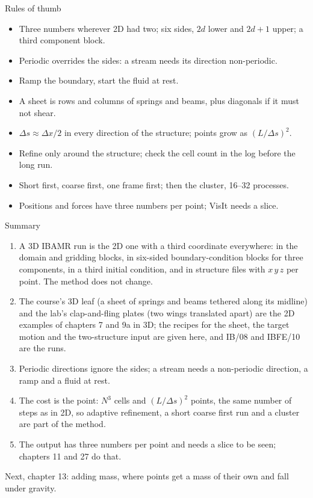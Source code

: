 \documentclass[aspectratio=169,11pt]{beamer}
\begin{document}
\begin{frame}{Rules of thumb}
\label{fr:thumb}
\small
\begin{itemize}
  \item Three numbers wherever 2D had two; six sides, $2d$ lower and $2d + 1$ upper; a third component block.
  \item Periodic overrides the sides: a stream needs its direction non-periodic.
  \item Ramp the boundary, start the fluid at rest.
  \item A sheet is rows and columns of springs and beams, plus diagonals if it must not shear.
  \item $\Delta s \approx \Delta x/2$ in every direction of the structure; points grow as $(L/\Delta s)^2$.
  \item Refine only around the structure; check the cell count in the log before the long run.
  \item Short first, coarse first, one frame first; then the cluster, 16--32 processes.
  \item Positions and forces have three numbers per point; VisIt needs a slice.
\end{itemize}
\end{frame}

\begin{frame}{Summary}
\label{fr:summary}
\footnotesize
\begin{enumerate}
  \item A 3D IBAMR run is the 2D one with a third coordinate everywhere: in the domain and gridding blocks, in six-sided boundary-condition blocks for three components, in a third initial condition, and in structure files with $x\,y\,z$ per point. The method does not change.
  \item The course's 3D leaf (a sheet of springs and beams tethered along its midline) and the lab's clap-and-fling plates (two wings translated apart) are the 2D examples of chapters 7 and 9a in 3D; the recipes for the sheet, the target motion and the two-structure input are given here, and IB/08 and IBFE/10 are the runs.
  \item Periodic directions ignore the sides; a stream needs a non-periodic direction, a ramp and a fluid at rest.
  \item The cost is the point: $N^3$ cells and $(L/\Delta s)^2$ points, the same number of steps as in 2D, so adaptive refinement, a short coarse first run and a cluster are part of the method.
  \item The output has three numbers per point and needs a slice to be seen; chapters 11 and 27 do that.
\end{enumerate}
\begin{homebox}
\footnotesize Next, chapter 13: adding mass, where points get a mass of their own and fall under gravity.
\end{homebox}
\end{frame}
\end{document}
